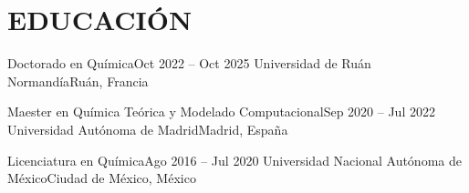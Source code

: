 \section{EDUCACIÓN}
\resumeSubHeadingListStart

  \resumeSubheading
    {Doctorado en Química}{Oct 2022 -- Oct 2025}
    {Universidad de Ruán Normandía}{Ruán, Francia}
  \resumeItemListStart
  \resumeItemListEnd

  \resumeSubheading
    {Maester en Química Teórica y Modelado Computacional}{Sep 2020 -- Jul 2022}
    {Universidad Autónoma de Madrid}{Madrid, España}
  \resumeItemListStart
  \resumeItemListEnd

  \resumeSubheading
    {Licenciatura en Química}{Ago 2016 -- Jul 2020}
    {Universidad Nacional Autónoma de México}{Ciudad de México, México}
  \resumeItemListStart
  \resumeItemListEnd

\resumeSubHeadingListEnd
